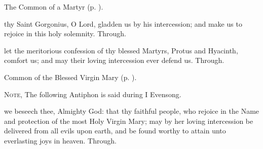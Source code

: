 
\begin{rubric}
	The Common of a Martyr (p. \pageref{CommonMartyrNotBishopCollect}).
\end{rubric}



\memorialCollect
{} thy Saint Gorgonius, O Lord, gladden us by his intercession; and make us to rejoice in this holy solemnity. Through.




\memorialCollect
{} let the meritorious confession of thy blessed Martyrs, Protus and Hyacinth, comfort us; and may their loving intercession ever defend us. Through.


\clearpage
{}

\begin{rubric}
	Common of the Blessed Virgin Mary (p. \pageref{CommonBVM}).
\end{rubric}

\begin{rubric}
	\textsc{Note,} The following Antiphon is said during I Evensong.
\end{rubric}


\collect
{} we beseech thee, Almighty God: that thy faithful people, who rejoice in the Name and protection of the most Holy Virgin Mary; may by her loving intercession be delivered from all evils upon earth, and be found worthy to attain unto everlasting joys in heaven. Through.



